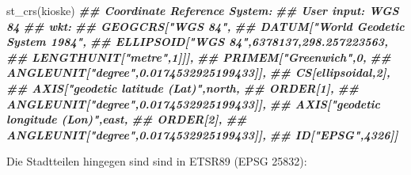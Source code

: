 \documentclass[11pt,german,a4paper]{article}
\newenvironment{Shaded}{\begin{snugshade}}{\end{snugshade}}
\newcommand{\DocumentationTok}[1]{\textcolor[rgb]{0.56,0.35,0.01}{\textbf{\textit{#1}}}}
\newcommand{\FunctionTok}[1]{\textcolor[rgb]{0.00,0.00,0.00}{#1}}
\newcommand{\NormalTok}[1]{#1}
\begin{document}
\begin{Shaded}
\begin{Highlighting}[]
\FunctionTok{st\_crs}\NormalTok{(kioske)}
\DocumentationTok{\#\# Coordinate Reference System:}
\DocumentationTok{\#\#   User input: WGS 84 }
\DocumentationTok{\#\#   wkt:}
\DocumentationTok{\#\# GEOGCRS["WGS 84",}
\DocumentationTok{\#\#     DATUM["World Geodetic System 1984",}
\DocumentationTok{\#\#         ELLIPSOID["WGS 84",6378137,298.257223563,}
\DocumentationTok{\#\#             LENGTHUNIT["metre",1]]],}
\DocumentationTok{\#\#     PRIMEM["Greenwich",0,}
\DocumentationTok{\#\#         ANGLEUNIT["degree",0.0174532925199433]],}
\DocumentationTok{\#\#     CS[ellipsoidal,2],}
\DocumentationTok{\#\#         AXIS["geodetic latitude (Lat)",north,}
\DocumentationTok{\#\#             ORDER[1],}
\DocumentationTok{\#\#             ANGLEUNIT["degree",0.0174532925199433]],}
\DocumentationTok{\#\#         AXIS["geodetic longitude (Lon)",east,}
\DocumentationTok{\#\#             ORDER[2],}
\DocumentationTok{\#\#             ANGLEUNIT["degree",0.0174532925199433]],}
\DocumentationTok{\#\#     ID["EPSG",4326]]}
\end{Highlighting}
\end{Shaded}

Die Stadtteilen hingegen sind sind in ETSR89 (EPSG 25832):
\end{document}
